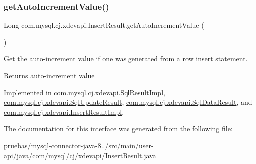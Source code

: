 \subsubsection{\texorpdfstring{get\+Auto\+Increment\+Value()}{getAutoIncrementValue()}}
{\footnotesize\ttfamily Long com.\+mysql.\+cj.\+xdevapi.\+Insert\+Result.\+get\+Auto\+Increment\+Value (\begin{DoxyParamCaption}{ }\end{DoxyParamCaption})}

Get the auto-\/increment value if one was generated from a row insert statement.

\begin{DoxyReturn}{Returns}
auto-\/increment value 
\end{DoxyReturn}


Implemented in \mbox{\hyperlink{classcom_1_1mysql_1_1cj_1_1xdevapi_1_1_sql_result_impl_ac1730d1c9d94a55bd5519e803be617e4}{com.\+mysql.\+cj.\+xdevapi.\+Sql\+Result\+Impl}}, \mbox{\hyperlink{classcom_1_1mysql_1_1cj_1_1xdevapi_1_1_sql_update_result_a7c839bddddabb36231503575810e8a1d}{com.\+mysql.\+cj.\+xdevapi.\+Sql\+Update\+Result}}, \mbox{\hyperlink{classcom_1_1mysql_1_1cj_1_1xdevapi_1_1_sql_data_result_aa6d3e3de7bb565c7086d71b0242c77d9}{com.\+mysql.\+cj.\+xdevapi.\+Sql\+Data\+Result}}, and \mbox{\hyperlink{classcom_1_1mysql_1_1cj_1_1xdevapi_1_1_insert_result_impl_a0849fb03ac4d7da386014ce3647e00ea}{com.\+mysql.\+cj.\+xdevapi.\+Insert\+Result\+Impl}}.



The documentation for this interface was generated from the following file\+:\begin{DoxyCompactItemize}
\item 
pruebas/mysql-\/connector-\/java-\/8../src/main/user-\/api/java/com/mysql/cj/xdevapi/\mbox{\hyperlink{_insert_result_8java}{Insert\+Result.\+java}}\end{DoxyCompactItemize}

